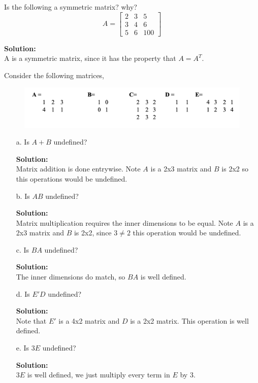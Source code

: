 \documentclass[12pt]{article}
\makeatletter
\theoremstyle{homework}
\newenvironment{exercise}[1]
{\def\@currentlabel{#1}\exercisecore}
{\endexercisecore}
\newcommand{\localhead}[1]{\par\smallskip\noindent\textbf{#1}\nobreak\\}%
\newcommand\solution{\localhead{Solution:}}
\makeatother
\begin{document}
\begin{exercise}{4} Is the following a symmetric matrix? why?\\
  \begin{equation*}
    A = 
    \begin{bmatrix}
      2 &3 &5 \\
      3 &4 &6 \\
      5 &6 &100
    \end{bmatrix}
  \end{equation*}
  \solution A is a symmetric matrix, since it has the property that $A = A^T$.
\end{exercise}
\vspace{1in}



\begin{exercise}{5} Consider the following matrices, 
  \begin{figure}[H]
    \begin{center}
    \includegraphics[width = .75\textwidth]{matrices.png}
    \end{center}
  \end{figure} 
  \begin{enumerate}
    \item[a.] Is $A + B$ undefined?\\
    \solution Matrix addition is done entrywise. Note $A$ is a 2x3 matrix and $B$ is 2x2 so this operations would be undefined.  
    \vspace{.15in}

    \item[b.] Is $AB$ undefined?\\
    \solution Matrix multiplication requires the inner dimensions to be equal. Note $A$ is a 2x3 matrix and $B$ is 2x2, since $3 \neq 2$ this operation would be undefined. 
    \vspace{.15in}
    

    \item[c.] Is $BA$ undefined?\\
    \solution The inner dimensions do match, so $BA$ is well defined. 
    \vspace{.15in}


    \item[d.] Is $E'D$ undefined?\\
    \solution Note that $E'$ is a 4x2 matrix and $D$ is a 2x2 matrix. This operation is well defined.  
    \vspace{.15in}


    \item[e.] Is $3E$ undefined?\\
    \solution $3E$ is well defined, we just multiply every term in $E$ by 3.   
  \end{enumerate}
\end{exercise}
\vspace{1in}
\end{document}
